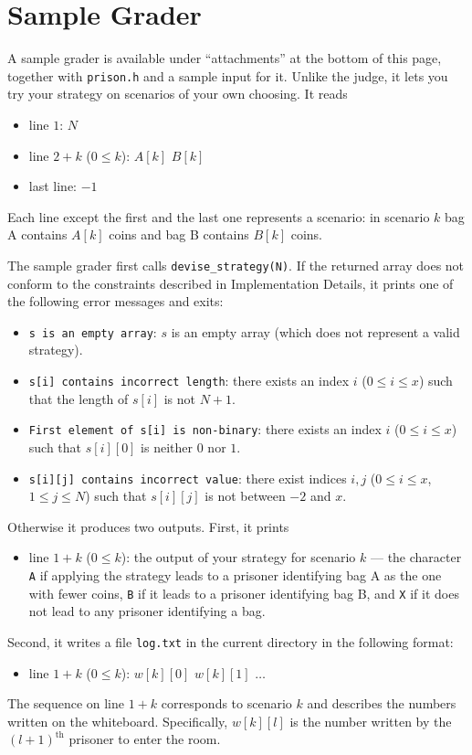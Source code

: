 \section*{Sample Grader}
A sample grader is available under ``attachments'' at the bottom of this page, together with
\texttt{prison.h} and a sample input for it. Unlike the judge, it lets you try your strategy on
scenarios of your own choosing. It reads
\begin{itemize}
  \item line $1$: $N$
  \item line $2 + k$ ($0 \leq k$): $A[k]$ $B[k]$
  \item last line: $-1$
\end{itemize}
Each line except the first and the last one represents a scenario: in scenario $k$ bag A contains
$A[k]$ coins and bag B contains $B[k]$ coins.

The sample grader first calls \texttt{devise\_strategy(N)}. If the returned array does not conform to
the constraints described in Implementation Details, it prints one of the following error messages and
exits:
\begin{itemize}
  \item \texttt{s is an empty array}: $s$ is an empty array (which does not represent a valid
  strategy).
  \item \texttt{s[i] contains incorrect length}: there exists an index $i$ ($0 \leq i \leq x$) such
  that the length of $s[i]$ is not $N+1$.
  \item \texttt{First element of s[i] is non-binary}: there exists an index $i$
  ($0 \leq i \leq x$) such that $s[i][0]$ is neither $0$ nor $1$.
  \item \texttt{s[i][j] contains incorrect value}: there exist indices $i, j$
  ($0 \leq i \leq x$, $1 \leq j \leq N$) such that $s[i][j]$ is not between $-2$ and $x$.
\end{itemize}

Otherwise it produces two outputs. First, it prints
\begin{itemize}
  \item line $1 + k$ ($0 \leq k$): the output of your strategy for scenario $k$ --- the character
  \texttt{A} if applying the strategy leads to a prisoner identifying bag A as the one with fewer
  coins, \texttt{B} if it leads to a prisoner identifying bag B, and \texttt{X} if it does not lead to
  any prisoner identifying a bag.
\end{itemize}
Second, it writes a file \texttt{log.txt} in the current directory in the following format:
\begin{itemize}
  \item line $1 + k$ ($0 \leq k$): $w[k][0]$ $w[k][1]$ $\ldots$
\end{itemize}
The sequence on line $1 + k$ corresponds to scenario $k$ and describes the numbers written on the
whiteboard. Specifically, $w[k][l]$ is the number written by the $(l+1)^{\text{th}}$ prisoner to enter
the room.


